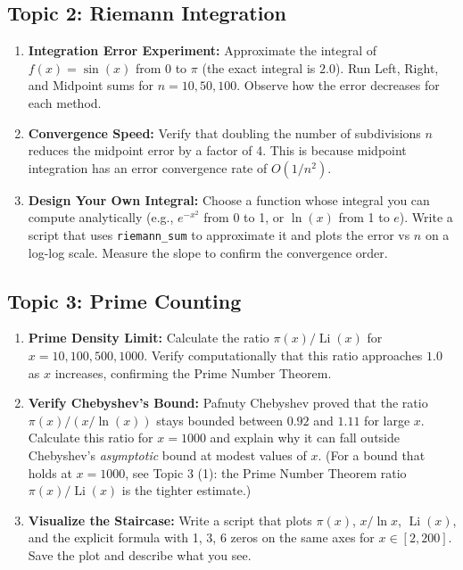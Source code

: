 \documentclass[11pt]{article}
\begin{document}
\subsection{Topic 2: Riemann Integration}
\begin{enumerate}
    \item \textbf{Integration Error Experiment:} Approximate the integral of $f(x) = \sin(x)$ from $0$ to $\pi$ (the exact integral is $2.0$). Run Left, Right, and Midpoint sums for $n=10, 50, 100$. Observe how the error decreases for each method.
    \item \textbf{Convergence Speed:} Verify that doubling the number of subdivisions $n$ reduces the midpoint error by a factor of 4. This is because midpoint integration has an error convergence rate of $O(1/n^2)$.
    \item \textbf{Design Your Own Integral:} Choose a function whose integral you can compute analytically (e.g., $e^{-x^2}$ from 0 to 1, or $\ln(x)$ from 1 to $e$). Write a script that uses \texttt{riemann\_sum} to approximate it and plots the error vs $n$ on a log-log scale. Measure the slope to confirm the convergence order.
\end{enumerate}

\subsection{Topic 3: Prime Counting}
\begin{enumerate}
    \item \textbf{Prime Density Limit:} Calculate the ratio $\pi(x) / \operatorname{Li}(x)$ for $x = 10, 100, 500, 1000$. Verify computationally that this ratio approaches $1.0$ as $x$ increases, confirming the Prime Number Theorem.
    \item \textbf{Verify Chebyshev's Bound:} Pafnuty Chebyshev proved that the ratio $\pi(x) / (x / \ln(x))$ stays bounded between $0.92$ and $1.11$ for large $x$. Calculate this ratio for $x=1000$ and explain why it can fall outside Chebyshev's \emph{asymptotic} bound at modest values of $x$. (For a bound that holds at $x=1000$, see Topic 3 (1): the Prime Number Theorem ratio $\pi(x)/\operatorname{Li}(x)$ is the tighter estimate.)
    \item \textbf{Visualize the Staircase:} Write a script that plots $\pi(x)$, $x/\ln x$, $\operatorname{Li}(x)$, and the explicit formula with 1, 3, 6 zeros on the same axes for $x \in [2, 200]$. Save the plot and describe what you see.
\end{enumerate}
\end{document}
